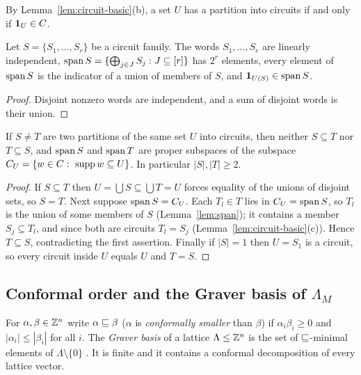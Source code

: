 By Lemma~\ref{lem:circuit-basic}(b), a set $U$ has a partition into circuits if and only if $\mathbf 1_U\in C$.

\begin{lemma}\label{lem:span}
Let $S=\{S_1,\dots,S_r\}$ be a circuit family. The words $S_1,\dots,S_r$ are linearly independent, $\operatorname{span} S=\{\bigoplus_{j\in J}S_j: J\subseteq[r]\}$ has $2^r$ elements, every element of $\operatorname{span} S$ is the indicator of a union of members of $S$, and $\mathbf 1_{U(S)}\in\operatorname{span} S$.
\end{lemma}

\begin{proof}
Disjoint nonzero words are independent, and a sum of disjoint words is their union.
\end{proof}

\begin{lemma}\label{lem:proper}
If $S\ne T$ are two partitions of the same set $U$ into circuits, then neither $S\subseteq T$ nor $T\subseteq S$, and $\operatorname{span} S$ and $\operatorname{span} T$ are proper subspaces of the subspace $C_U=\{w\in C:\ \operatorname{supp} w\subseteq U\}$. In particular $|S|,|T|\ge2$.
\end{lemma}

\begin{proof}
If $S\subseteq T$ then $U=\bigcup S\subseteq\bigcup T=U$ forces equality of the unions of disjoint sets, so $S=T$. Next suppose $\operatorname{span} S=C_U$. Each $T_l\in T$ lies in $C_U=\operatorname{span} S$, so $T_l$ is the union of some members of $S$ (Lemma~\ref{lem:span}); it contains a member $S_j\subseteq T_l$, and since both are circuits $T_l=S_j$ (Lemma~\ref{lem:circuit-basic}(c)). Hence $T\subseteq S$, contradicting the first assertion. Finally if $|S|=1$ then $U=S_1$ is a circuit, so every circuit inside $U$ equals $U$ and $T=S$.
\end{proof}

\subsection{Conformal order and the Graver basis of \texorpdfstring{$\Lambda_M$}{Lambda\_M}}

For $\alpha,\beta\in\mathbb Z^n$ write $\alpha\sqsubseteq\beta$ ($\alpha$ is \emph{conformally smaller} than $\beta$) if $\alpha_i\beta_i\ge0$ and $|\alpha_i|\le|\beta_i|$ for all $i$. The \emph{Graver basis} of a lattice $\Lambda\le\mathbb Z^n$ is the set of $\sqsubseteq$-minimal elements of $\Lambda\setminus\{0\}$ \cite{Graver1975,Sturmfels1996}. It is finite and it contains a conformal decomposition of every lattice vector.

